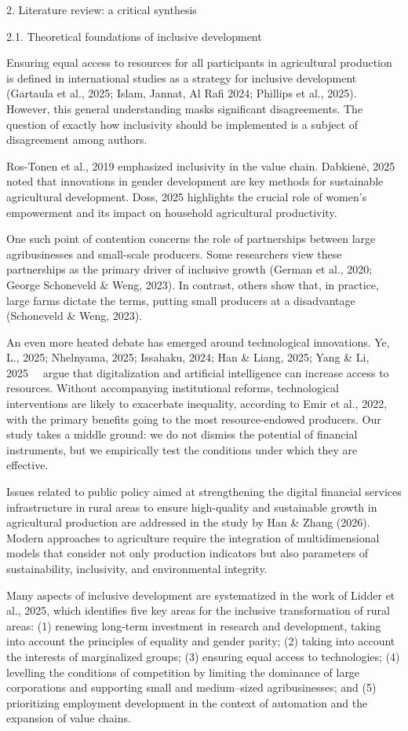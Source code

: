 \documentclass[
]{article}
\begin{document}
2. Literature review: a critical synthesis

2.1. Theoretical foundations of inclusive development

Ensuring equal access to resources for all participants in agricultural
production is defined in international studies as a strategy for
inclusive development (Gartaula et al., 2025; Islam, Jannat, Al Rafi
2024; Phillips et al., 2025). However, this general understanding masks
significant disagreements. The question of exactly how inclusivity
should be implemented is a subject of disagreement among authors.

Ros-Tonen et al., 2019 emphasized inclusivity in the value chain.
Dabkienė, 2025 noted that innovations in gender development are key
methods for sustainable agricultural development. Doss, 2025 highlights
the crucial role of women's empowerment and its impact on household
agricultural productivity.

One such point of contention concerns the role of partnerships between
large agribusinesses and small-scale producers. Some researchers view
these partnerships as the primary driver of inclusive growth (German et
al., 2020; George Schoneveld \& Weng, 2023). In contrast, others show
that, in practice, large farms dictate the terms, putting small
producers at a disadvantage (Schoneveld \& Weng, 2023).

An even more heated debate has emerged around technological innovations.
Ye, L., 2025; Nhelnyama, 2025; Issahaku, 2024; Han \& Liang, 2025; Yang
\& Li, 2025~~ argue that digitalization and artificial intelligence can
increase access to resources. Without accompanying institutional
reforms, technological interventions are likely to exacerbate
inequality, according to Emir et al., 2022, with the primary benefits
going to the most resource-endowed producers. Our study takes a middle
ground: we do not dismiss the potential of financial instruments, but we
empirically test the conditions under which they are effective.

Issues related to public policy aimed at strengthening the digital
financial services infrastructure in rural areas to ensure high-quality
and sustainable growth in agricultural production are addressed in the
study by Han \& Zhang (2026). Modern approaches to agriculture require
the integration of multidimensional models that consider not only
production indicators but also parameters of sustainability,
inclusivity, and environmental integrity.

Many aspects of inclusive development are systematized in the work of
Lidder et al., 2025, which identifies five key areas for the inclusive
transformation of rural areas: (1) renewing long-term investment in
research and development, taking into account the principles of equality
and gender parity; (2) taking into account the interests of marginalized
groups; (3) ensuring equal access to technologies; (4) levelling the
conditions of competition by limiting the dominance of large
corporations and supporting small and medium--sized agribusinesses; and
(5) prioritizing employment development in the context of automation and
the expansion of value chains.
\end{document}
